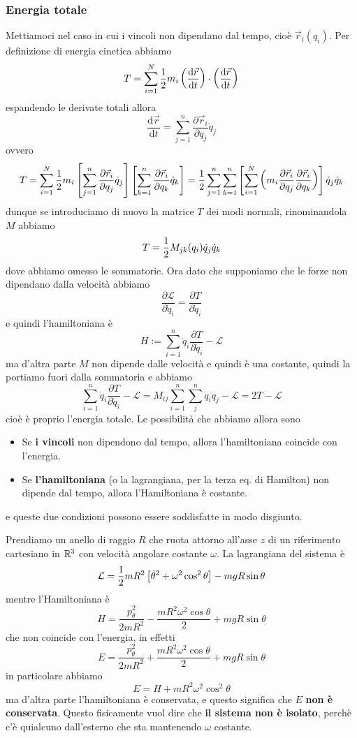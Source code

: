 \documentclass[11pt]{scrartcl}
\newcommand{\dif}{\text{d}}
\newcommand{\posit}{\vec{r}}
\begin{document}
	\subsubsection{Energia totale}
	Mettiamoci nel caso in cui i vincoli non dipendano dal tempo, cioè $\posit_i(q_i)$.
	Per definizione di energia cinetica abbiamo
	$$T=\sum_{i=1}^{N}\half m_i \left(\frac{\dif \posit}{\dif t}\right)\cdot\left(\frac{\dif \posit}{\dif t}\right)$$
	espandendo le derivate totali allora
	$$\frac{\dif \posit}{\dif t}=\sum_{j=1}^{n}\frac{\partial \posit_i}{\partial q_j}\dot{q}_j$$
	ovvero
	$$T=\sum_{i=1}^{N}\half m_i \left[\sum_{j=1}^{n}\frac{\partial \posit_i}{\partial q_j}\dot{q}_j\right]\left[\sum_{k=1}^{n}\frac{\partial \posit_i}{\partial q_k}\dot{q}_k\right]=\half\sum_{j=1}^{n}\sum_{k=1}^{n}\left[\sum_{i=1}^{N}\left(m_i\frac{\partial \posit_i}{\partial q_j}\frac{\partial \posit_i}{\partial q_k}\right)\right]\dot{q}_j\dot{q}_k$$
	dunque se introduciamo di nuovo la matrice $T$ dei modi normali, rinominandola $M$ abbiamo
	$$T=\frac{1}{2} M_{jk}(q_i)\dot{q}_j\dot{q}_k$$
	dove abbiamo omesso le sommatorie. Ora dato che supponiamo che le forze non dipendano dalla velocità abbiamo
	$$\frac{\partial \mathcal{L}}{\partial \dot{q}_i}=\frac{\partial T}{\partial \dot{q}_i}$$
	e quindi l'hamiltoniana è
	$$H:=\sum_{i=1}^{n}\dot{q}_i\frac{\partial T}{\partial \dot{q}_i}-\mathcal{L}$$
	ma d'altra parte $M$ non dipende dalle velocità e quindi è una costante, quindi la portiamo fuori dalla sommatoria e abbiamo
	$$\sum_{i=1}^{n}\dot{q}_i\frac{\partial T}{\partial \dot{q}_i}-\mathcal{L}=M_{ij}\sum_{i=1}^{n}\sum_{j}^{n}\dot{q}_i\dot{q}_j-\mathcal{L}=2T-\mathcal{L}$$
	cioè è proprio l'energia totale. Le possibilità che abbiamo allora sono
	\begin{itemize}
		\item Se \textbf{i vincoli} non dipendono dal tempo, allora l'hamiltoniana coincide con l'energia.
		\item Se \textbf{l'hamiltoniana} (o la lagrangiana, per la terza eq. di Hamilton) non dipende dal tempo, allora l'Hamiltoniana è costante.
	\end{itemize}
	e queste due condizioni possono essere soddisfatte in modo disgiunto. 
	\begin{example}
		Prendiamo un anello di raggio $R$ che ruota attorno all'asse $z$ di un riferimento cartesiano in $\mathbb R^3$ con velocità angolare costante $\omega$. La lagrangiana del sistema è
		$$\mathcal{L}=\frac{1}{2} mR^2\left[\dot{\theta}^2+\omega^2\cos^2\theta \right]-mgR\sin\theta$$
		mentre l'Hamiltoniana è
		$$H=\frac{p_\theta^2}{2mR^2}-\frac{mR^2\omega^2\cos\theta }{2}+mgR\sin\theta$$
		che non coincide con l'energia, in effetti
		$$E=\frac{p_\theta^2}{2mR^2}+\frac{mR^2\omega^2\cos\theta }{2}+mgR\sin\theta$$
		in particolare abbiamo
		$$E=H+mR^2\omega^2\cos^2\theta$$
		ma d'altra parte l'hamiltoniana è conservata, e questo significa che $E$ \textbf{non è conservata}. Questo fisicamente vuol dire che \textbf{il sistema non è isolato}, perchè c'è quialcuno dall'esterno che sta mantenendo $\omega$ costante.
	\end{example}
\end{document}
